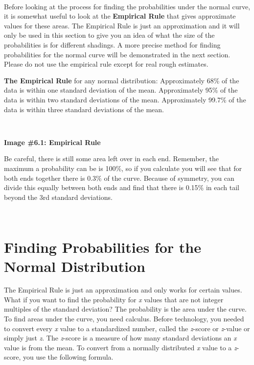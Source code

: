 \documentclass[
]{book}
\begin{document}
\textbf{\\
}

Before looking at the process for finding the probabilities under the normal curve, it is somewhat useful to look at the \textbf{Empirical Rule} that gives approximate values for these areas. The Empirical Rule is just an approximation and it will only be used in this section to give you an idea of what the size of the probabilities is for different shadings. A more precise method for finding probabilities for the normal curve will be demonstrated in the next section. Please do not use the empirical rule except for real rough estimates.

\textbf{The Empirical Rule} for any normal distribution:
Approximately 68\% of the data is within one standard deviation of the mean.
Approximately 95\% of the data is within two standard deviations of the mean.
Approximately 99.7\% of the data is within three standard deviations of the mean.

\textbf{\\
}

\textbf{Image \#6.1: Empirical Rule}

Be careful, there is still some area left over in each end. Remember, the maximum a probability can be is 100\%, so if you calculate you will see that for both ends together there is 0.3\% of the curve. Because of
symmetry, you can divide this equally between both ends and find that there is 0.15\% in each tail beyond the 3rd standard deviations.

\textbf{\\
}

\hypertarget{finding-probabilities-for-the-normal-distribution}{%
\section{Finding Probabilities for the Normal Distribution}\label{finding-probabilities-for-the-normal-distribution}}

The Empirical Rule is just an approximation and only works for certain values. What if you want to find the probability for \emph{x} values that are not integer multiples of the standard deviation? The probability is the area under the curve. To find areas under the curve, you need calculus. Before technology, you needed to convert every \emph{x} value to a standardized number, called the \emph{z}-score or \emph{z}-value or simply just \emph{z}. The \emph{z}-score is a measure of how many standard deviations an \emph{x} value is from the mean. To convert from a normally distributed \emph{x} value to a \emph{z}-score, you use the following formula.
\end{document}
